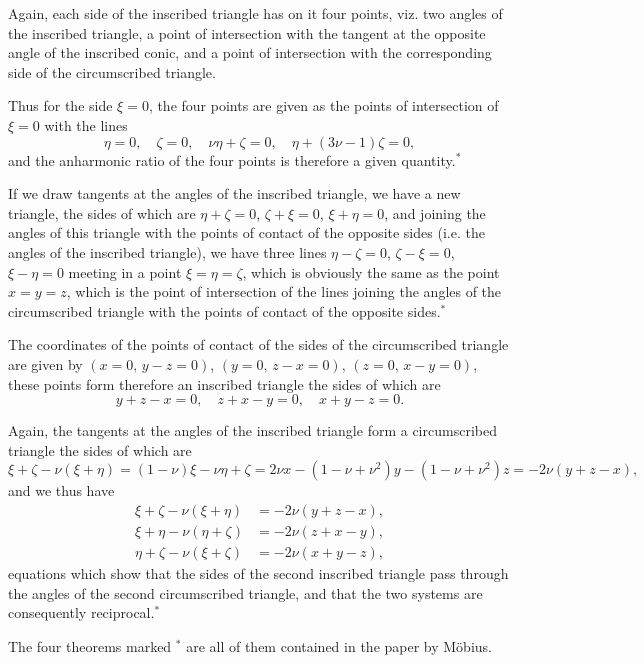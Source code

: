\documentclass[11pt,a4paper]{book}
\begin{document}
Again, each side of the inscribed triangle has on it four points, viz. two angles of the inscribed triangle, a point of intersection with the tangent at the opposite angle of the inscribed conic, and a point of intersection with the corresponding side of the circumscribed triangle.

Thus for the side $\xi = 0$, the four points are given as the points of intersection of $\xi = 0$ with the lines
\[
\eta = 0,\quad \zeta = 0,\quad \nu\eta + \zeta = 0,\quad \eta + (3\nu - 1)\zeta = 0,
\]
and the anharmonic ratio of the four points is therefore a given quantity.$^*$

If we draw tangents at the angles of the inscribed triangle, we have a new triangle, the sides of which are $\eta + \zeta = 0$, $\zeta + \xi = 0$, $\xi + \eta = 0$, and joining the angles of this triangle with the points of contact of the opposite sides (i.e. the angles of the inscribed triangle), we have three lines $\eta - \zeta = 0$, $\zeta - \xi = 0$, $\xi - \eta = 0$ meeting in a point $\xi = \eta = \zeta$, which is obviously the same as the point $x = y = z$, which is the point of intersection of the lines joining the angles of the circumscribed triangle with the points of contact of the opposite sides.$^*$

The coordinates of the points of contact of the sides of the circumscribed triangle are given by $(x = 0,\, y - z = 0)$, $(y = 0,\, z - x = 0)$, $(z = 0,\, x - y = 0)$, these points form therefore an inscribed triangle the sides of which are
\[
y + z - x = 0,\quad z + x - y = 0,\quad x + y - z = 0.
\]

Again, the tangents at the angles of the inscribed triangle form a circumscribed triangle the sides of which are
\[
\xi + \zeta - \nu(\xi + \eta) = (1 - \nu)\xi - \nu\eta + \zeta = 2\nu x - (1 - \nu + \nu^2)y - (1 - \nu + \nu^2)z = -2\nu(y + z - x),
\]
and we thus have
\begin{align*}
\xi + \zeta - \nu(\xi + \eta) &= -2\nu(y + z - x),\\
\xi + \eta - \nu(\eta + \zeta) &= -2\nu(z + x - y),\\
\eta + \zeta - \nu(\xi + \zeta) &= -2\nu(x + y - z),
\end{align*}
equations which show that the sides of the second inscribed triangle pass through the angles of the second circumscribed triangle, and that the two systems are consequently reciprocal.$^*$

The four theorems marked $^*$ are all of them contained in the paper by M\"{o}bius.
\end{document}
